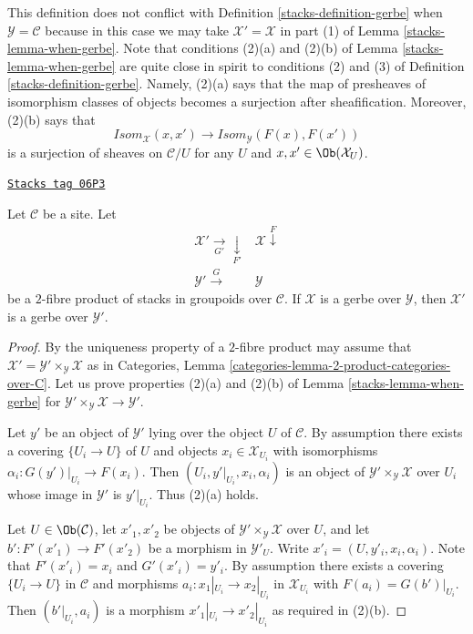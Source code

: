 This definition does not conflict with
Definition \ref{stacks-definition-gerbe}
when $\mathcal{Y} = \mathcal{C}$ because in this case we may take
$\mathcal{X}' = \mathcal{X}$ in part (1) of
Lemma \ref{stacks-lemma-when-gerbe}.
Note that conditions (2)(a) and (2)(b) of
Lemma \ref{stacks-lemma-when-gerbe}
are quite close in spirit to conditions (2) and (3) of
Definition \ref{stacks-definition-gerbe}.
Namely, (2)(a) says that the map of presheaves of isomorphism
classes of objects becomes a surjection after sheafification.
Moreover, (2)(b) says that
$$
\mathit{Isom}_\mathcal{X}(x, x')
\longrightarrow
\mathit{Isom}_\mathcal{Y}(F(x), F(x'))
$$
is a surjection of sheaves on $\mathcal{C}/U$ for any $U$ and
$x, x' \in \Ob(\mathcal{X}_U)$.

\begin{lemma}
\label{stacks-lemma-base-change-gerbe}
\href{https://stacks.math.columbia.edu/tag/06P3}{\texttt{Stacks tag 06P3}}

Let $\mathcal{C}$ be a site. Let
$$
\begin{array}{cc}\mathcal{X}' \underset{G'}{\longrightarrow}\underset{F'}{\downarrow} & \mathcal{X} \overset{F}{\downarrow} \\ \mathcal{Y}' \overset{G}{\longrightarrow} & \mathcal{Y}\end{array}
$$
be a $2$-fibre product of stacks in groupoids over $\mathcal{C}$.
If $\mathcal{X}$ is a gerbe over $\mathcal{Y}$, then
$\mathcal{X}'$ is a gerbe over $\mathcal{Y}'$.
\end{lemma}

\begin{proof}

By the uniqueness property of a $2$-fibre product may assume that
$\mathcal{X}' = \mathcal{Y}' \times_\mathcal{Y} \mathcal{X}$
as in
Categories, Lemma \ref{categories-lemma-2-product-categories-over-C}.
Let us prove properties (2)(a) and (2)(b) of
Lemma \ref{stacks-lemma-when-gerbe}
for $\mathcal{Y}' \times_\mathcal{Y} \mathcal{X} \to \mathcal{Y}'$.

\medskip\noindent
Let $y'$ be an object of $\mathcal{Y}'$ lying over the object $U$
of $\mathcal{C}$. By assumption there exists
a covering $\{U_i \to U\}$ of $U$ and objects
$x_i \in \mathcal{X}_{U_i}$ with isomorphisms
$\alpha_i : G(y')|_{U_i} \to F(x_i)$.
Then $(U_i, y'|_{U_i}, x_i, \alpha_i)$ is an object of
$\mathcal{Y}' \times_\mathcal{Y} \mathcal{X}$ over $U_i$
whose image in $\mathcal{Y}'$ is $y'|_{U_i}$. Thus (2)(a) holds.

\medskip\noindent
Let $U \in \Ob(\mathcal{C})$, let $x'_1, x'_2$ be objects of
$\mathcal{Y}' \times_\mathcal{Y} \mathcal{X}$ over $U$, and let
$b' : F'(x'_1) \to F'(x'_2)$ be a morphism in $\mathcal{Y}'_U$.
Write $x'_i = (U, y'_i, x_i, \alpha_i)$. Note that $F'(x'_i) = x_i$
and $G'(x'_i) = y'_i$. By assumption there exists
a covering $\{U_i \to U\}$ in $\mathcal{C}$ and morphisms
$a_i : x_1|_{U_i} \to x_2|_{U_i}$ in $\mathcal{X}_{U_i}$ with
$F(a_i) = G(b')|_{U_i}$. Then $(b'|_{U_i}, a_i)$ is a morphism
$x'_1|_{U_i} \to x'_2|_{U_i}$ as required in (2)(b).
\end{proof}

